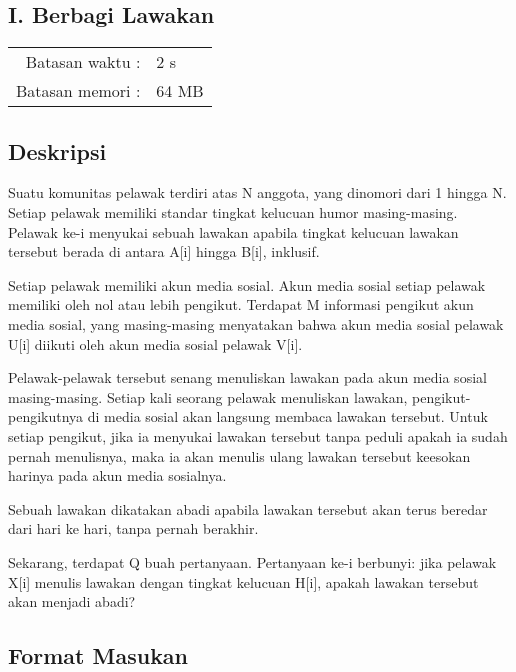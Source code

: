 \documentclass[../main_problemset.tex]{subfiles} %
\newcommand{\problemName}{I. Berbagi Lawakan}
\newcommand{\problemTL}{2 s}
\newcommand{\problemML}{64 MB}
\begin{document}
\begin{center}
    \section*{\problemName}
    \addcontentsline{toc}{section}{\problemName} %

    \begin{tabular}{rl}
    Batasan waktu : & \problemTL \\
    Batasan memori : & \problemML
    \end{tabular}
\end{center}

\subsection*{Deskripsi}

Suatu komunitas pelawak terdiri atas N anggota, yang dinomori dari 1 hingga N. Setiap pelawak memiliki standar tingkat kelucuan humor masing-masing. Pelawak ke-i menyukai sebuah lawakan apabila tingkat kelucuan lawakan tersebut berada di antara A[i] hingga B[i], inklusif.

Setiap pelawak memiliki akun media sosial. Akun media sosial setiap pelawak memiliki oleh nol atau lebih pengikut. Terdapat M informasi pengikut akun media sosial, yang masing-masing menyatakan bahwa akun media sosial pelawak U[i] diikuti oleh akun media sosial pelawak V[i].

Pelawak-pelawak tersebut senang menuliskan lawakan pada akun media sosial masing-masing. Setiap kali seorang pelawak menuliskan lawakan, pengikut-pengikutnya di media sosial akan langsung membaca lawakan tersebut. Untuk setiap pengikut, jika ia menyukai lawakan tersebut tanpa peduli apakah ia sudah pernah menulisnya, maka ia akan menulis ulang lawakan tersebut keesokan harinya pada akun media sosialnya.

Sebuah lawakan dikatakan abadi apabila lawakan tersebut akan terus beredar dari hari ke hari, tanpa pernah berakhir.

Sekarang, terdapat Q buah pertanyaan. Pertanyaan ke-i berbunyi: jika pelawak X[i] menulis lawakan dengan tingkat kelucuan H[i], apakah lawakan tersebut akan menjadi abadi?

\subsection*{Format Masukan}
\end{document}

